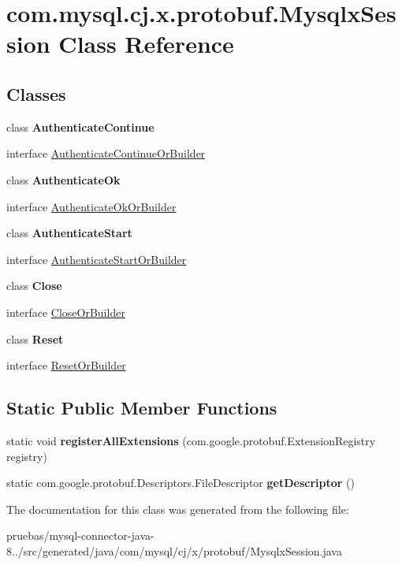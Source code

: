 \hypertarget{classcom_1_1mysql_1_1cj_1_1x_1_1protobuf_1_1_mysqlx_session}{}\section{com.\+mysql.\+cj.\+x.\+protobuf.\+Mysqlx\+Session Class Reference}
\label{classcom_1_1mysql_1_1cj_1_1x_1_1protobuf_1_1_mysqlx_session}
\subsection*{Classes}
\begin{DoxyCompactItemize}
\item 
class {\bfseries Authenticate\+Continue}
\item 
interface \mbox{\hyperlink{interfacecom_1_1mysql_1_1cj_1_1x_1_1protobuf_1_1_mysqlx_session_1_1_authenticate_continue_or_builder}{Authenticate\+Continue\+Or\+Builder}}
\item 
class {\bfseries Authenticate\+Ok}
\item 
interface \mbox{\hyperlink{interfacecom_1_1mysql_1_1cj_1_1x_1_1protobuf_1_1_mysqlx_session_1_1_authenticate_ok_or_builder}{Authenticate\+Ok\+Or\+Builder}}
\item 
class {\bfseries Authenticate\+Start}
\item 
interface \mbox{\hyperlink{interfacecom_1_1mysql_1_1cj_1_1x_1_1protobuf_1_1_mysqlx_session_1_1_authenticate_start_or_builder}{Authenticate\+Start\+Or\+Builder}}
\item 
class {\bfseries Close}
\item 
interface \mbox{\hyperlink{interfacecom_1_1mysql_1_1cj_1_1x_1_1protobuf_1_1_mysqlx_session_1_1_close_or_builder}{Close\+Or\+Builder}}
\item 
class {\bfseries Reset}
\item 
interface \mbox{\hyperlink{interfacecom_1_1mysql_1_1cj_1_1x_1_1protobuf_1_1_mysqlx_session_1_1_reset_or_builder}{Reset\+Or\+Builder}}
\end{DoxyCompactItemize}
\subsection*{Static Public Member Functions}
\begin{DoxyCompactItemize}
\item 
\mbox{\label{classcom_1_1mysql_1_1cj_1_1x_1_1protobuf_1_1_mysqlx_session_af02253cfc5f4eb6de69b962eec9818a1}} 
static void {\bfseries register\+All\+Extensions} (com.\+google.\+protobuf.\+Extension\+Registry registry)
\item 
\mbox{\label{classcom_1_1mysql_1_1cj_1_1x_1_1protobuf_1_1_mysqlx_session_a96b1ed99c26853eaa3f4cf7fab4a9809}} 
static com.\+google.\+protobuf.\+Descriptors.\+File\+Descriptor {\bfseries get\+Descriptor} ()
\end{DoxyCompactItemize}


The documentation for this class was generated from the following file\+:\begin{DoxyCompactItemize}
\item 
pruebas/mysql-\/connector-\/java-\/8../src/generated/java/com/mysql/cj/x/protobuf/Mysqlx\+Session.\+java\end{DoxyCompactItemize}
